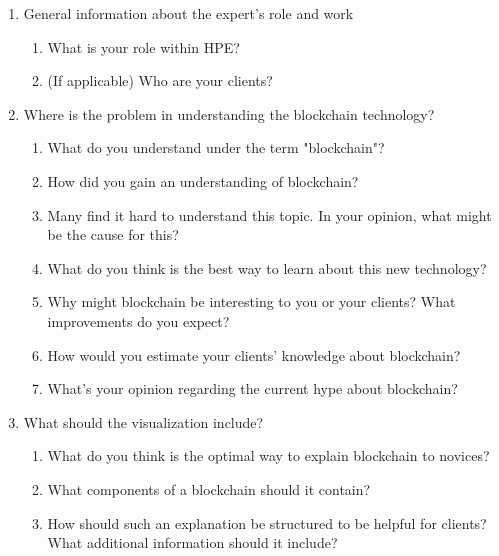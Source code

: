 \begin{enumerate}
    \item General information about the expert's role and work
    \begin{enumerate}
        \item What is your role within HPE?
        \item (If applicable) Who are your clients? 
    \end{enumerate}
    \item Where is the problem in understanding the blockchain technology?
    \begin{enumerate}
        \item What do you understand under the term "blockchain"?
        \item How did you gain an understanding of blockchain?
        \item Many find it hard to understand this topic. In your opinion, what might be the cause for this?
        \item What do you think is the best way to learn about this new technology?
        \item Why might blockchain be interesting to you or your clients? What improvements do you expect?
        \item How would you estimate your clients' knowledge about blockchain?
        \item What's your opinion regarding the current hype about blockchain?
    \end{enumerate}
    \item What should the visualization include?
    \begin{enumerate}
        \item What do you think is the optimal way to explain blockchain to novices?
        \item What components of a blockchain should it contain?
        \item How should such an explanation be structured to be helpful for clients? What additional information should it include?
    \end{enumerate}
\end{enumerate}


